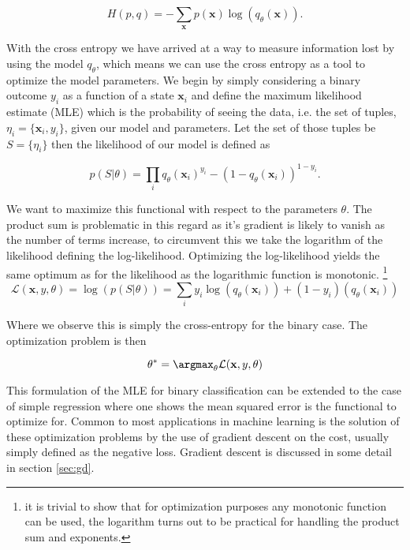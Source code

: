 \begin{equation}
H(p, q) = - \sum_\mathbf{x} p(\mathbf{x})\log(q_\theta(\mathbf{x})).
\end{equation}

\noindent With the cross entropy we have arrived at a way to measure information lost by using the model $q_\theta$, which means we can use the cross entropy as a tool to optimize the model parameters. We begin by simply considering a binary outcome $y_i$ as a function of a state $\mathbf{x}_i$ and define the maximum likelihood estimate (MLE) which is the probability of seeing the data, i.e. the set of tuples, $\eta_i = \{\mathbf{x}_i, y_i\}$, given our model and parameters. Let the set of those tuples be $S = \{\eta_i\}$ then the likelihood of our model is defined as 

\begin{equation}\label{eq:likelihood}
p(S | \theta) = \prod_i q_\theta(\mathbf{x}_i)^{y_i} - (1-q_\theta(\mathbf{x}_i))^{1-y_i}.
\end{equation}

\noindent We want to maximize this functional with respect to the parameters $\theta$. The product sum is problematic in this regard as it's gradient is likely to vanish as the number of terms increase, to circumvent this we take the logarithm of the likelihood defining the log-likelihood. Optimizing the log-likelihood yields the same optimum as for the likelihood as the logarithmic function is monotonic. \footnote{it is trivial to show that for optimization purposes any monotonic function can be used, the logarithm turns out to be practical for handling the product sum and exponents.}
\begin{equation}
\mathcal{L}(\mathbf{x}, y, \theta) = \log(p(S | \theta)) = \sum_i y_i\log(q_\theta(\mathbf{x}_i)) + (1-y_i)(q_\theta(\mathbf{x}_i))
\end{equation}

\noindent Where we observe this is simply the cross-entropy for the binary case. The optimization problem is then 

\begin{equation}
\theta^* = \argmax_\theta \mathcal{L}(\mathbf{x}, y, \theta )
\end{equation}

\noindent This formulation of the MLE for binary classification can be extended to the case of simple regression where one shows the mean squared error is the functional to optimize for. Common to most applications in machine learning is the solution of these optimization problems by the use of gradient descent on the cost, usually simply defined as the negative loss. Gradient descent is discussed in some detail in section \ref{sec:gd}.

